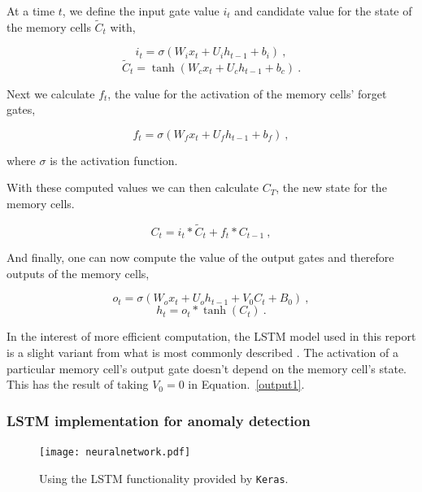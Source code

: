 At a time $t$, we define the input gate value $i_t$ and candidate value for the state of the memory cells $\widetilde{C}_t$ with,

\begin{equation}
    i_t = \sigma(W_i x_t + U_i h_{t-1} + b_i)~,
\end{equation}
\begin{equation}
    \widetilde{C}_t = \tanh(W_c x_t + U_c h_{t-1} + b_c)~.
\end{equation}

Next we calculate $f_t$, the value for the activation of the memory cells' forget gates,

\begin{equation}
    f_t = \sigma (W_f x_t + U_f h_{t-1} +b_f)~,
\end{equation}

where $\sigma$ is the activation function.

With these computed values we can then calculate $C_T$, the new state for the memory cells.

\begin{equation}
    C_t = i_t * \widetilde{C}_t + f_t * C_{t-1}~,
\end{equation}

And finally, one can now compute the value of the output gates and therefore outputs of the memory cells,

\begin{equation}
   o_t = \sigma(W_o x_t + U_o h_{t-1} + V_0 C_t + B_0)~,
   \label{output1}
\end{equation}
\begin{equation}
    h_t = o_t * \tanh(C_t)~.
\end{equation}

In the interest of more efficient computation, the LSTM model used in this report is a slight variant from what is most commonly described \cite{Graves2012}. The activation of a particular memory cell's output gate doesn't depend on the memory cell's state. This has the result of taking $V_0 = 0$ in Equation.~\eqref{output1}.

\subsubsection{LSTM implementation for anomaly detection}

\begin{figure}[t]
    \centering
    \texttt{[image: neuralnetwork.pdf]}
    \caption[Neural Network]{Using the LSTM functionality provided by \texttt{Keras}.}
    \label{fig:neuralnet}
\end{figure}

